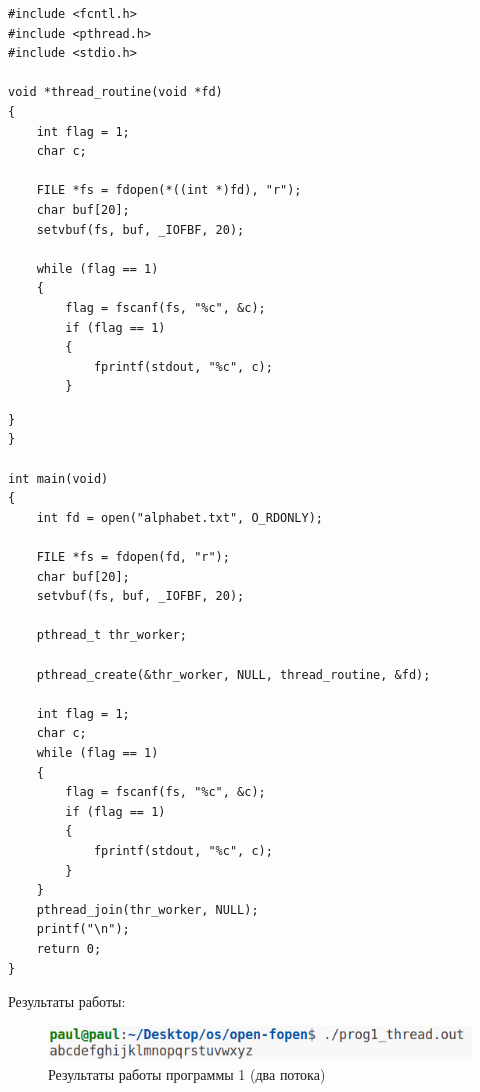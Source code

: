 \begin{center}
	\captionsetup{justification=raggedright,singlelinecheck=off}

	\begin{lstlisting}[label=lst:prog1-th-1,caption=Программа 1 --- два потока --- часть 1]
#include <fcntl.h>
#include <pthread.h>
#include <stdio.h>

void *thread_routine(void *fd) 
{
    int flag = 1;
    char c;

    FILE *fs = fdopen(*((int *)fd), "r");
    char buf[20];
    setvbuf(fs, buf, _IOFBF, 20);

    while (flag == 1) 
    {
        flag = fscanf(fs, "%c", &c);
        if (flag == 1) 
        {
            fprintf(stdout, "%c", c);
        }
	\end{lstlisting}
\end{center}

\clearpage

\begin{center}
	\captionsetup{justification=raggedright,singlelinecheck=off}

	\begin{lstlisting}[label=lst:prog1-th-2,caption=Программа 1 --- два потока --- часть 2]
    }
}

int main(void) 
{
    int fd = open("alphabet.txt", O_RDONLY);

    FILE *fs = fdopen(fd, "r");
    char buf[20];
    setvbuf(fs, buf, _IOFBF, 20);

    pthread_t thr_worker;

    pthread_create(&thr_worker, NULL, thread_routine, &fd);

    int flag = 1;
    char c;
    while (flag == 1) 
    {
        flag = fscanf(fs, "%c", &c);
        if (flag == 1) 
        {
            fprintf(stdout, "%c", c);
        }
    }
    pthread_join(thr_worker, NULL);
    printf("\n");
    return 0;
}
	\end{lstlisting}
\end{center}

Результаты работы:

\begin{figure}[h]
	\centering
	\captionsetup{justification=centering}
	\includegraphics[width=150mm]{img/prog1_thread.png}
	\caption{Результаты работы программы 1 (два потока)}
	\label{fig:prog-1-th-result}
\end{figure}

